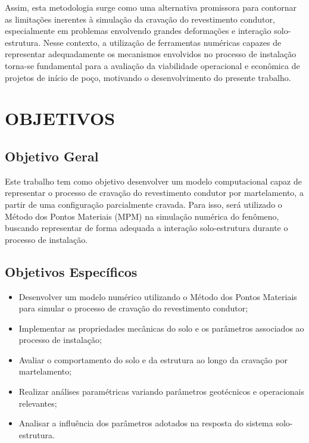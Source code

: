 Assim, esta metodologia surge como uma alternativa promissora para contornar as limitações inerentes à simulação da cravação do revestimento condutor, especialmente em problemas envolvendo grandes deformações e interação solo-estrutura. Nesse contexto, a utilização de ferramentas numéricas capazes de representar adequadamente os mecanismos envolvidos no processo de instalação torna-se fundamental para a avaliação da viabilidade operacional e econômica de projetos de início de poço, motivando o desenvolvimento do presente trabalho.


\section{OBJETIVOS}

\subsection{Objetivo Geral}

Este trabalho tem como objetivo desenvolver um modelo computacional capaz de representar o processo de cravação do revestimento condutor por martelamento, a partir de uma configuração parcialmente cravada. Para isso, será utilizado o Método dos Pontos Materiais (MPM) na simulação numérica do fenômeno, buscando representar de forma adequada a interação solo-estrutura durante o processo de instalação. 

\subsection{Objetivos Específicos}

\begin{itemize}
	\item Desenvolver um modelo numérico utilizando o Método dos Pontos Materiais para simular o processo de cravação do revestimento condutor;
	
	\item Implementar as propriedades mecânicas do solo e os parâmetros associados ao processo de instalação;
	
	\item Avaliar o comportamento do solo e da estrutura ao longo da cravação por martelamento;
	
	\item Realizar análises paramétricas variando parâmetros geotécnicos e operacionais relevantes;
	
	\item Analisar a influência dos parâmetros adotados na resposta do sistema solo-estrutura.
\end{itemize}
